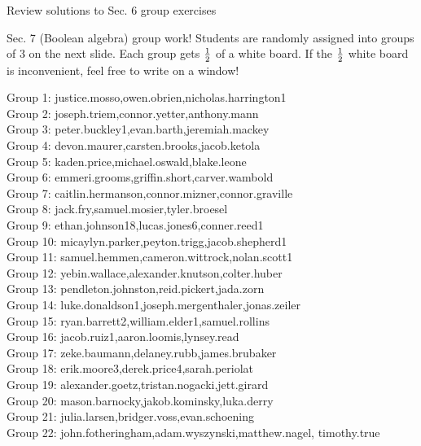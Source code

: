 \documentclass[10pt]{beamer}
\begin{document}
\begin{frame}[standout]

\vfill 
\alert{Review solutions to Sec. 6 group exercises}
\vfill

\end{frame}









\begin{frame}[standout]

\alert{Sec. 7 (Boolean algebra) group work!}
\vfill
Students are randomly assigned into groups of 3 on the next slide.
\vfill 
Each group gets $\frac{1}{2}$ of a white board.
\vfill
If the  $\frac{1}{2}$ white board is inconvenient, feel free to write on a window! 
\end{frame}

\begin{frame}
\footnotesize
Group 1: justice.mosso,owen.obrien,nicholas.harrington1\\
Group 2: joseph.triem,connor.yetter,anthony.mann\\
Group 3: peter.buckley1,evan.barth,jeremiah.mackey\\
Group 4: devon.maurer,carsten.brooks,jacob.ketola\\
Group 5: kaden.price,michael.oswald,blake.leone\\
Group 6: emmeri.grooms,griffin.short,carver.wambold\\
Group 7: caitlin.hermanson,connor.mizner,connor.graville\\
Group 8: jack.fry,samuel.mosier,tyler.broesel\\
Group 9: ethan.johnson18,lucas.jones6,conner.reed1\\
Group 10: micaylyn.parker,peyton.trigg,jacob.shepherd1\\
Group 11: samuel.hemmen,cameron.wittrock,nolan.scott1\\
Group 12: yebin.wallace,alexander.knutson,colter.huber\\
Group 13: pendleton.johnston,reid.pickert,jada.zorn\\
Group 14: luke.donaldson1,joseph.mergenthaler,jonas.zeiler\\
Group 15: ryan.barrett2,william.elder1,samuel.rollins\\
Group 16: jacob.ruiz1,aaron.loomis,lynsey.read\\
Group 17: zeke.baumann,delaney.rubb,james.brubaker\\
Group 18: erik.moore3,derek.price4,sarah.periolat\\
Group 19: alexander.goetz,tristan.nogacki,jett.girard\\
Group 20: mason.barnocky,jakob.kominsky,luka.derry\\
Group 21: julia.larsen,bridger.voss,evan.schoening\\
Group 22: john.fotheringham,adam.wyszynski,matthew.nagel, timothy.true\\
\end{frame}
\end{document}
